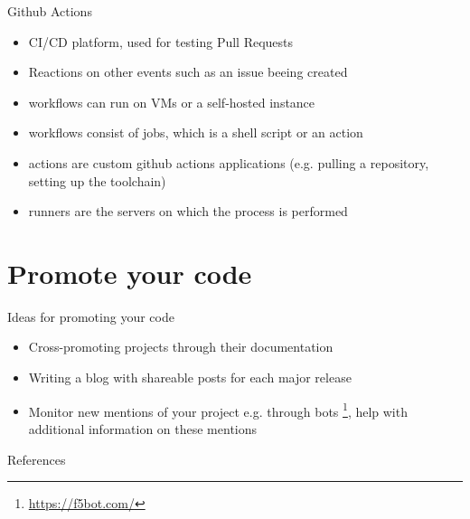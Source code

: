 \documentclass[compress,aspectratio=169]{beamer}
\begin{document}
		\begin{frame}{Github Actions}
			\begin{itemize}
				\item 	CI/CD platform, used for testing Pull Requests
				\item 	Reactions on other events such as an issue beeing created
				\item 	workflows can run on VMs or a self-hosted instance
				\item 	workflows consist of jobs, which is a shell script or an action
				\item 	actions are custom github actions applications (e.g. pulling a repository, setting up the toolchain) 
				\item 	runners are the servers on which the process is performed
			\end{itemize}
		\end{frame}
		
	
	\section{Promote your code}
	
		\begin{frame}{Ideas for promoting your code}
		
			\begin{itemize}
				\item Cross-promoting projects through their documentation
				\item Writing a blog with shareable posts for each major release
				\item Monitor new mentions of your project e.g. through bots \footnote[frame]{\url{https://f5bot.com/}}, help with additional information on these mentions
				
			\end{itemize}
			
		\end{frame}
	
		
		\begin{frame}{References}
			\renewcommand*{\bibfont}{\normalfont\scriptsize}
			\printbibliography[heading=none]
			\label{pg:lastpage} %
		\end{frame}
\end{document}
